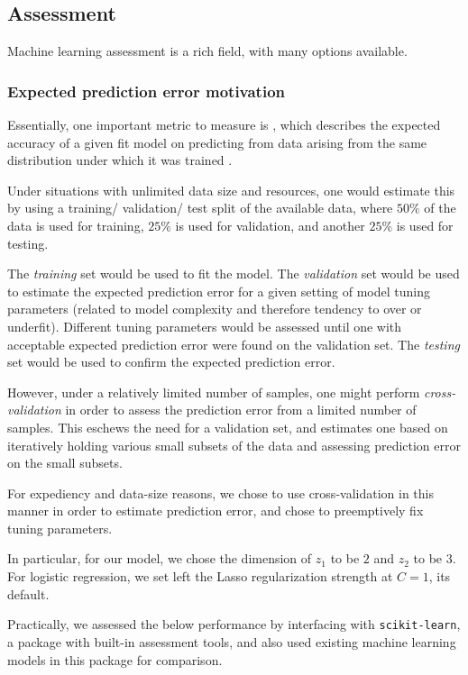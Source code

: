 \subsection{Assessment}

Machine learning assessment is a rich field, with many options available.

\subsubsection{Expected prediction error motivation}

Essentially, one important metric to measure is , which describes the expected accuracy of a given fit model on predicting from data arising from the same distribution under which it was trained \cite{friedman_elements_2001}.

Under situations with unlimited data size and resources, one would estimate this by using a training/ validation/ test split of the available data, where $50\%$ of the data is used for training, $25\%$ is used for validation, and another $25\%$ is used for testing.

The \textit{training} set would be used to fit the model. The \textit{validation} set would be used to estimate the expected prediction error for a given setting of model tuning parameters (related to model complexity and therefore tendency to over or underfit). Different tuning parameters would be assessed until one with acceptable expected prediction error were found on the validation set. The \textit{testing} set would be used to confirm the expected prediction error.

However, under a relatively limited number of samples, one might perform \textit{cross-validation} in order to assess the prediction error from a limited number of samples. This eschews the need for a validation set, and estimates one based on iteratively holding various small subsets of the data and assessing prediction error on the small subsets.

For expediency and data-size reasons, we chose to use cross-validation in this manner in order to estimate prediction error, and chose to preemptively fix tuning parameters.

In particular, for our model, we chose the dimension of $z_1$ to be $2$ and $z_2$ to be $3$. For logistic regression, we set left the Lasso regularization strength at $C=1$, its default.

Practically, we assessed the below performance by interfacing with \texttt{scikit-learn}\cite{pedregosa_scikit-learn:_2011}, a package with built-in assessment tools, and also used existing machine learning models in this package for comparison. 


